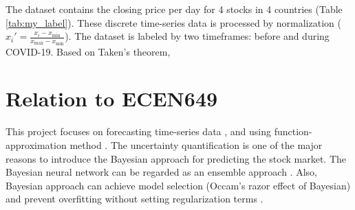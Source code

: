 \documentclass[a4paper]{article}
\begin{document}
The dataset contains the closing price per day for 4 stocks in 4 countries (Table \ref{tab:my_label}). These discrete time-series data is processed by normalization ($x_{i}' = \frac{x_{i} - x_{\min}}{x_{\max} - x_{\min}}$). The dataset is labeled by two timeframes: before and during COVID-19. Based on Taken's theorem, 



\cite[ch5]{bishop2006pattern}

\section{Relation to ECEN649}

This project focuses on forecasting time-series data \cite[Ch. 11]{braga2020fundamentals}, and using function-approximation method \cite[Ch. 6]{braga2020fundamentals}. The uncertainty quantification \cite[Ch. 7]{braga2020fundamentals} is one of the major reasons to introduce the Bayesian approach \cite[Ch. 2]{braga2020fundamentals} for predicting the stock market. The Bayesian neural network can be regarded as an ensemble approach \cite[Ch. 3.5]{braga2020fundamentals}. Also, Bayesian approach can achieve model selection (Occam's razor effect of Bayesian) \cite[Ch. 8]{braga2020fundamentals} and prevent overfitting without setting regularization terms \cite[Ch. 6]{braga2020fundamentals}.
\end{document}
